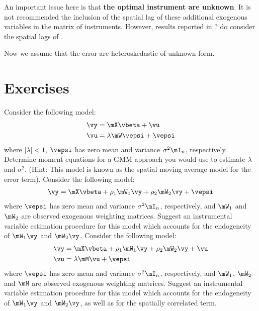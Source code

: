 An important issue here is that \textbf{the optimal instrument are unknown}. It is not recommended the inclusion of the spatial lag of these additional exogenous variables in the matrix of instruments. However, results reported in ? do consider the spatial lags of . 

Now we assume that the error are heteroskedastic of unknown form. 


\section{Exercises}

\begin{exercises}
    \exercise Consider the following model:
  		\begin{equation*}
  			\begin{aligned}
  				\vy & = \mX\vbeta + \vu \\
  				\vu & = \lambda\mW\vepsi + \vepsi
  			\end{aligned}
  		\end{equation*}
  		where $\left|\lambda\right| < 1$, $\vepsi$ has zero mean and variance $\sigma^2\mI_n$, respectively. Determine moment equations for a GMM approach you would use to estimate $\lambda$ and $\sigma^2$. (Hint: This model is known as the spatial moving average model for the error term).
  		\exercise Consider the following model:
        \begin{equation*}
        \begin{aligned}
        \vy  = \mX\vbeta + \rho_1\mW_1\vy + \rho_2\mW_2\vy+ \vepsi
        \end{aligned}
        \end{equation*}
        where $\vepsi$ has zero mean and variance $\sigma^2\mI_n$, respectively, and $\mW_1$ and $\mW_2$ are observed exogenous weighting matrices. Suggest an instrumental variable estimation procedure for this model which accounts for the endogeneity of $\mW_1\vy$ and $\mW_2\vy$. 
        \exercise Consider the following model:
    \begin{equation*}
    	\begin{aligned}
    		\vy & = \mX\vbeta + \rho_1\mW_1\vy + \rho_2\mW_2\vy+ \vu \\
    		\vu & = \lambda\mM\vu + \vepsi
    	\end{aligned}
    \end{equation*}
    where $\vepsi$ has zero mean and variance $\sigma^2\mI_n$, respectively, and $\mW_1$, $\mW_2$ and $\mM$ are observed exogenous weighting matrices. Suggest an instrumental variable estimation procedure for this model which accounts for the endogeneity of $\mW_1\vy$ and $\mW_2\vy$, as well as for the spatially correlated term. 
\end{exercises}   


